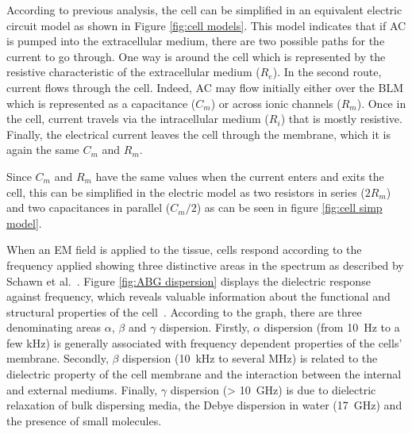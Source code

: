 According to previous analysis, the cell can be simplified in an equivalent electric circuit model as shown in Figure \ref{fig:cell models}. This model indicates that if AC is pumped into the extracellular medium, there are two possible paths for the current to go through. One way is around the cell which is represented by the resistive characteristic of the extracellular medium ($R_e$). In the second route, current flows through the cell. Indeed, AC may flow initially either over the BLM which is represented as a capacitance ($C_m$) or across ionic channels ($R_m$). Once in the cell, current travels via the intracellular medium ($R_i$) that is mostly resistive. Finally, the electrical current leaves the cell through the membrane, which it is again the same $C_m$ and $R_m$.

Since $C_m$ and $R_m$ have the same values when the current enters and exits the cell, this can be simplified in the electric model as two resistors in series ($2R_m$) and two capacitances in parallel ($C_m/2$) as can be seen in figure \ref{fig:cell simp model}.

When an EM field is applied to the tissue, cells respond according to the frequency applied showing three distinctive areas in the spectrum as described by Schawn et al.~\cite{schwan1957electrical,schwan1962electrical}. Figure \ref{fig:ABG dispersion} displays the dielectric response against frequency, which reveals valuable information about the functional and structural properties of the cell~\cite{lvovich2012impedance}. According to the graph, there are three denominating areas $\alpha$, $\beta$ and $\gamma$ dispersion. Firstly, $\alpha$ dispersion (from \SI{10}{\hertz} to a few \si{\kilo\hertz}) is generally associated with frequency dependent properties of the cells’ membrane. Secondly, $\beta$ dispersion (\SI{10}{\kilo\hertz} to several \si{\mega\hertz}) is related to the dielectric property of the cell membrane and the interaction between the internal and external mediums. Finally, $\gamma$ dispersion (> \SI{10}{\giga\hertz}) is due to dielectric relaxation of bulk dispersing media, the Debye dispersion in water (\SI{17}{\giga\hertz}) and the presence of small molecules. 

